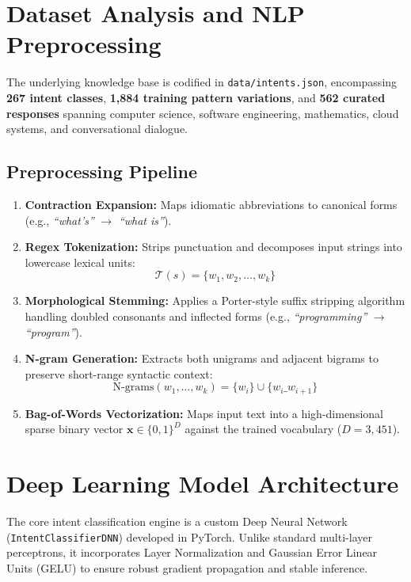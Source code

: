 \documentclass[11pt,a4paper]{article}
\begin{document}
\section{Dataset Analysis and NLP Preprocessing}
The underlying knowledge base is codified in \texttt{data/intents.json}, encompassing \textbf{267 intent classes}, \textbf{1,884 training pattern variations}, and \textbf{562 curated responses} spanning computer science, software engineering, mathematics, cloud systems, and conversational dialogue.

\subsection{Preprocessing Pipeline}
\begin{enumerate}[noitemsep]
    \item \textbf{Contraction Expansion:} Maps idiomatic abbreviations to canonical forms (e.g., \textit{``what's''} $\rightarrow$ \textit{``what is''}).
    \item \textbf{Regex Tokenization:} Strips punctuation and decomposes input strings into lowercase lexical units:
    \[
    \mathcal{T}(s) = \{ w_1, w_2, \dots, w_k \}
    \]
    \item \textbf{Morphological Stemming:} Applies a Porter-style suffix stripping algorithm handling doubled consonants and inflected forms (e.g., \textit{``programming''} $\rightarrow$ \textit{``program''}).
    \item \textbf{N-gram Generation:} Extracts both unigrams and adjacent bigrams to preserve short-range syntactic context:
    \[
    \text{N-grams}(w_1, \dots, w_k) = \{ w_i \} \cup \{ w_i \_ w_{i+1} \}
    \]
    \item \textbf{Bag-of-Words Vectorization:} Maps input text into a high-dimensional sparse binary vector $\mathbf{x} \in \{0, 1\}^D$ against the trained vocabulary ($D = 3,451$).
\end{enumerate}

\section{Deep Learning Model Architecture}
The core intent classification engine is a custom Deep Neural Network (\texttt{IntentClassifierDNN}) developed in PyTorch. Unlike standard multi-layer perceptrons, it incorporates Layer Normalization and Gaussian Error Linear Units (GELU) to ensure robust gradient propagation and stable inference.
\end{document}
